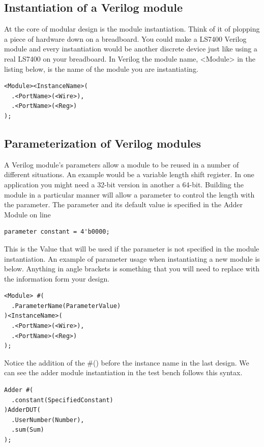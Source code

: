   \subsection{Instantiation of a Verilog module}
    At the core of modular design is the module instantiation. Think of it of plopping a piece of hardware down on a breadboard. You could make a LS7400 Verilog module and every instantiation would be another discrete device just like using a real LS7400 on your breadboard. In Verilog the module name, <Module> in the listing below, is the name of the module you are instantiating.
  \begin{lstlisting}[caption={Module instantiation template}]
<Module><InstanceName>(
  .<PortName>(<Wire>),
  .<PortName>(<Reg>)
);
  \end{lstlisting}
  
  \subsection{Parameterization of Verilog modules}
    A Verilog module's parameters allow a module to be reused in a number of different situations. An example would be a variable length shift register. In one application you might need a 32-bit version in another a 64-bit. Building the module in a particular manner will allow a parameter to control the length with the parameter. The parameter and its default value is specified in the Adder Module on line
    \begin{lstlisting}
parameter constant = 4'b0000;
    \end{lstlisting}
    This is the Value that will be used if the parameter is not specified in the module instantiation. An example of parameter usage when instantiating a new module is below. Anything in angle brackets is something that you will need to replace with the information form your design.
  \begin{lstlisting}[caption={Module instantiation template with parameterization}]
<Module> #(
  .ParameterName(ParameterValue)
)<InstanceName>(
  .<PortName>(<Wire>),
  .<PortName>(<Reg>)
);
  \end{lstlisting}
  Notice the addition of the \#() before the instance name in the last design. We can see the adder module instantiation in the test bench follows this syntax.
  \begin{lstlisting}[caption={Module instantiation from Adder test bench}]
Adder #(
  .constant(SpecifiedConstant)
)AdderDUT(
  .UserNumber(Number),
  .sum(Sum)
);
  \end{lstlisting}

